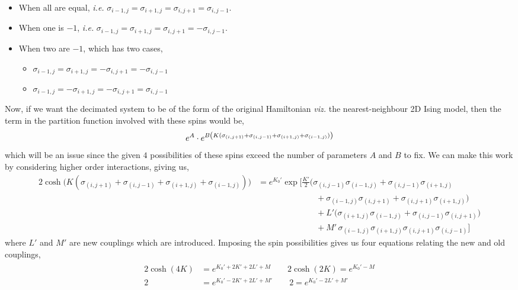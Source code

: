 \begin{itemize}
    \item When all are equal, \textit{i.e.} $\sigma_{i-1,j}=\sigma_{i+1,j}=\sigma_{i,j+1}=\sigma_{i,j-1}$.
    \item When one is $-1$, \textit{i.e.} $\sigma_{i-1,j}=\sigma_{i+1,j}=\sigma_{i,j+1}=-\sigma_{i,j-1}$.
    \item When two are $-1$, which has two cases,
    \begin{itemize}
        \item[\triangleright] $\sigma_{i-1,j}=\sigma_{i+1,j}=-\sigma_{i,j+1}=-\sigma_{i,j-1}$
        \item[\triangleright] $\sigma_{i-1,j}=-\sigma_{i+1,j}=-\sigma_{i,j+1}=\sigma_{i,j-1}$
    \end{itemize}
\end{itemize}
Now, if we want the decimated system to be of the form of the original Hamiltonian \textit{viz.} the nearest-neighbour 2D Ising model, then the term in the partition function involved with these spins would be, 
$$e^{A}\cdot e^{B\qty(K(\sigma_{(i,j+1)}+\sigma_{(i,j-1)}+\sigma_{(i+1,j)}+\sigma_{(i-1,j)}))}$$
which will be an issue since the given $4$ possibilities of these spins exceed the number of parameters $A$ and $B$ to fix. We can make this work by considering higher order interactions, giving us, 
\begin{align*}
2\cosh\Big(K(\sigma_{(i,j+1)}+\sigma_{(i,j-1)}+\sigma_{(i+1,j)}+\sigma_{(i-1,j)})\Big) &= e^{K_0'} \exp\Bigg[
\frac{K'}{2}\Big(
\sigma_{(i,j-1)}\sigma_{(i-1,j)}
+ \sigma_{(i,j-1)}\sigma_{(i+1,j)} \\
&\quad\qquad\qquad\qquad
+ \sigma_{(i-1,j)}\sigma_{(i,j+1)}
+ \sigma_{(i,j+1)}\sigma_{(i+1,j)}
\Big) \\
&\quad\qquad \qquad\qquad + L'\Big(
\sigma_{(i+1,j)}\sigma_{(i-1,j)}
+ \sigma_{(i,j-1)}\sigma_{(i,j+1)}
\Big) \\
&\quad\qquad \qquad\qquad + M'\,
\sigma_{(i-1,j)}\sigma_{(i+1,j)}
\sigma_{(i,j+1)}\sigma_{(i,j-1)}
\Bigg]
\end{align*}
where $L'$ and $M'$ are new couplings which are introduced. Imposing the spin possibilities gives us four equations relating the new and old couplings,
\begin{align}
    \begin{split}
        2\cosh(4K) &= e^{K_0' + 2K' + 2L'+M}\qquad  2\cosh(2K) = e^{K_0'- M}\\
      2 &= e^{K_0'- 2K'+2L'+M'}    \qquad 2 = e^{K_0'- 2L'+M'}\\
    \end{split}
\end{align}

